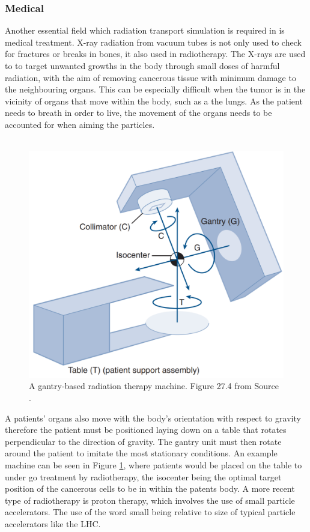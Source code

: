 \documentclass[12pt,a4paper]{article}
\begin{document}
\subsubsection{Medical}
\noindent Another essential field which radiation transport simulation is required in is medical treatment. X-ray radiation from vacuum tubes is not only used to check for fractures or breaks in bones, it also used in radiotherapy. The X-rays are used to to target unwanted growths in the body through small doses of harmful radiation, with the aim of removing cancerous tissue with minimum damage to the neighbouring organs. This can be especially difficult when the tumor is in the vicinity of organs that move within the body, such as a the lungs. As the patient needs to breath in order to live, the movement of the organs needs to be accounted for when aiming the particles.
\\\\
\begin{figure}[h!]
\centering
\includegraphics[scale=0.35]{Images//introduction//radiotherapy.png}
\caption[width=\columnwidth]{A gantry-based radiation therapy machine. Figure 27.4 from Source \cite{cancer}.}
\label{cancer}
\end{figure}

\noindent A patients' organs also move with the body's orientation with respect to gravity therefore the patient must be positioned laying down on a table that rotates perpendicular to the direction of gravity. The gantry unit must then rotate around the patient to imitate the most stationary conditions. An example machine can be seen in Figure \ref{cancer}, where patients would be placed on the table to under go treatment by radiotherapy, the isocenter being the optimal target position of the cancerous cells to be in within the patents body.  A more recent type of radiotherapy is proton therapy, which involves the use of small particle accelerators. The use of the word small being relative to size of typical particle accelerators like the LHC.
\end{document}
